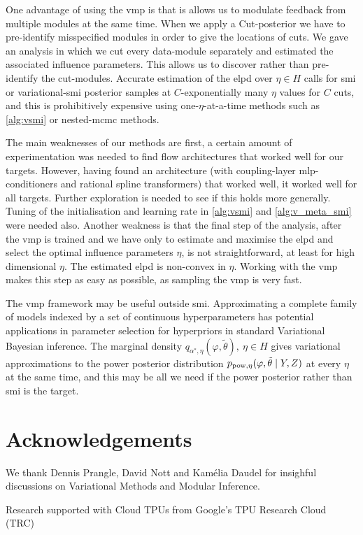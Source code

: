 One advantage of using the \acrshort*{vmp} is that is allows us to modulate feedback from multiple modules at the same time. When we apply a Cut-posterior we have to pre-identify misspecified modules in order to give the locations of cuts. We gave an analysis in which we cut every data-module separately and estimated the associated influence parameters. This allows us to discover rather than pre-identify the cut-modules. 
Accurate estimation of the \acrshort*{elpd} over $\eta\in H$ calls for \acrshort*{smi} or variational-\acrshort*{smi} posterior samples at 
$C$-exponentially many $\eta$ values
for $C$ cuts, and this is prohibitively expensive using one-$\eta$-at-a-time methods such as \cref{alg:vsmi} or nested-\acrshort*{mcmc} methods. 

The main weaknesses of our methods are first, a certain amount of experimentation was needed to find flow architectures that worked well for our targets. However, having found an architecture (with coupling-layer \acrshort*{mlp}-conditioners and rational spline transformers) that worked well, it worked well for all targets. Further exploration is needed to see if this holds more generally. Tuning of the initialisation and learning rate in \cref{alg:vsmi} and \cref{alg:v_meta_smi} were needed also. Another weakness is that the final step of the analysis, after the \acrshort*{vmp} is trained and we have only to estimate and maximise the \acrshort*{elpd} and select the optimal influence parameters $\eta$, is not straightforward, at least for high dimensional $\eta$. The estimated \acrshort*{elpd} is non-convex in $\eta$. Working with the \acrshort*{vmp} makes this step as easy as possible, as sampling the \acrshort*{vmp} is very fast.



The \acrshort*{vmp} framework may be useful outside \acrlong*{smi}. Approximating a complete family of models indexed by a set of continuous hyperparameters has potential applications in parameter selection for hyperpriors in standard Variational Bayesian inference. The marginal density  $q_{\alpha^*,\eta}(\varphi,\tilde\theta),\ \eta\in H$ gives variational approximations to the power posterior distribution $p_{\operatorname{\text{pow}},\eta}(\varphi,\tilde\theta\mid Y,Z)$ at every $\eta$ at the same time, and this may be all we need if the power posterior rather than \acrshort*{smi} is the target.


\section*{Acknowledgements}
We thank Dennis Prangle, David Nott and Kamélia Daudel for insighful discussions on Variational Methods and Modular Inference.

Research supported with Cloud TPUs from Google's TPU Research Cloud (TRC)
